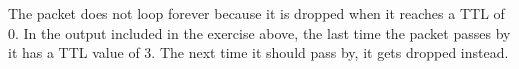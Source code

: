 The packet does not loop forever because it is dropped when it reaches a TTL of 0. In the output included in the exercise above, the last time the packet passes by it has a TTL value of 3. The next time it should pass by, it gets dropped instead.